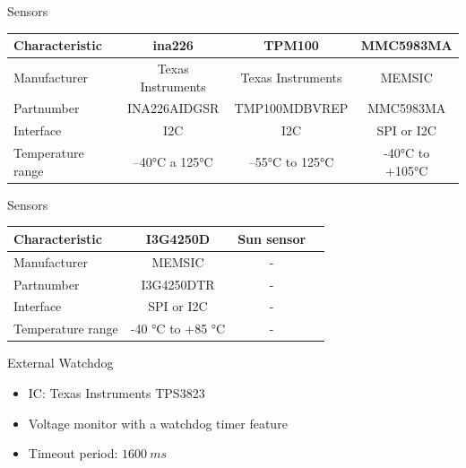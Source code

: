 \documentclass{beamer}
\begin{document}
\begin{frame}{Sensors}

    \begin{table}[!htb]\scriptsize
    \centering
    \label{tab:cost-estimation}
    \begin{tabular}{lccc}
        \toprule[1.5pt]
        \textbf{Characteristic} & \textbf{ina226} & \textbf{TPM100} & \textbf{MMC5983MA} \\
        \midrule
        Manufacturer        &  Texas Instruments & Texas Instruments  & MEMSIC  \\
        Partnumber          & INA226AIDGSR & TMP100MDBVREP & MMC5983MA \\
        Interface           & I2C    & I2C & SPI or I2C\\
        Temperature range   & –40°C a 125°C & –55°C to 125°C & -40°C to +105°C \\        
        \bottomrule[1.5pt]
    \end{tabular}
\end{table}

\end{frame}

\begin{frame}{Sensors}

    \begin{table}[!htb]\scriptsize
    \centering
    \label{tab:cost-estimation}
    \begin{tabular}{lccc}
        \toprule[1.5pt]
        \textbf{Characteristic} & \textbf{I3G4250D} & \textbf{Sun sensor} \\
        \midrule
        Manufacturer     &  MEMSIC & -  \\
        Partnumber       & I3G4250DTR & - \\
        Interface        & SPI or I2C    & - \\
        Temperature range   & -40 °C to +85 °C & - \\
        
        \bottomrule[1.5pt]
    \end{tabular}
\end{table}

\end{frame}

\begin{frame}{External Watchdog}

    \begin{itemize}
        \item IC: Texas Instruments TPS3823
        \vspace{0.5cm}
        \item Voltage monitor with a watchdog timer feature
        \vspace{0.5cm}
        \item Timeout period: $1600\ ms$
        \vspace{0.5cm}
    \end{itemize}

\end{frame}
\end{document}
